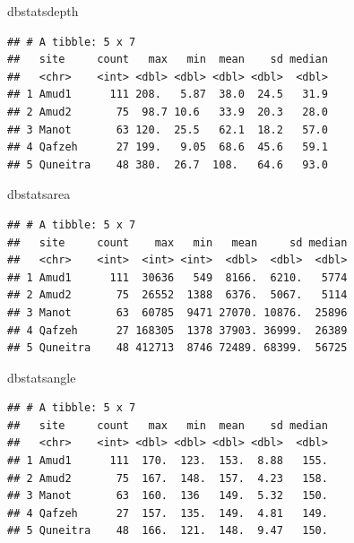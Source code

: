 \documentclass[
]{article}
\newenvironment{Shaded}{\begin{snugshade}}{\end{snugshade}}
\newcommand{\NormalTok}[1]{#1}
\begin{document}
\begin{Shaded}
\begin{Highlighting}[]
\NormalTok{dbstatsdepth}
\end{Highlighting}
\end{Shaded}

\begin{verbatim}
## # A tibble: 5 x 7
##   site     count   max   min  mean    sd median
##   <chr>    <int> <dbl> <dbl> <dbl> <dbl>  <dbl>
## 1 Amud1      111 208.   5.87  38.0  24.5   31.9
## 2 Amud2       75  98.7 10.6   33.9  20.3   28.0
## 3 Manot       63 120.  25.5   62.1  18.2   57.0
## 4 Qafzeh      27 199.   9.05  68.6  45.6   59.1
## 5 Quneitra    48 380.  26.7  108.   64.6   93.0
\end{verbatim}

\begin{Shaded}
\begin{Highlighting}[]
\NormalTok{dbstatsarea}
\end{Highlighting}
\end{Shaded}

\begin{verbatim}
## # A tibble: 5 x 7
##   site     count    max   min   mean     sd median
##   <chr>    <int>  <int> <int>  <dbl>  <dbl>  <dbl>
## 1 Amud1      111  30636   549  8166.  6210.   5774
## 2 Amud2       75  26552  1388  6376.  5067.   5114
## 3 Manot       63  60785  9471 27070. 10876.  25896
## 4 Qafzeh      27 168305  1378 37903. 36999.  26389
## 5 Quneitra    48 412713  8746 72489. 68399.  56725
\end{verbatim}

\begin{Shaded}
\begin{Highlighting}[]
\NormalTok{dbstatsangle}
\end{Highlighting}
\end{Shaded}

\begin{verbatim}
## # A tibble: 5 x 7
##   site     count   max   min  mean    sd median
##   <chr>    <int> <dbl> <dbl> <dbl> <dbl>  <dbl>
## 1 Amud1      111  170.  123.  153.  8.88   155.
## 2 Amud2       75  167.  148.  157.  4.23   158.
## 3 Manot       63  160.  136   149.  5.32   150.
## 4 Qafzeh      27  157.  135.  149.  4.81   149.
## 5 Quneitra    48  166.  121.  148.  9.47   150.
\end{verbatim}
\end{document}
